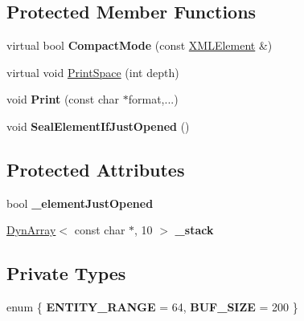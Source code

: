 \subsection*{Protected Member Functions}
\begin{DoxyCompactItemize}
\item 
virtual bool {\bfseries Compact\+Mode} (const \hyperlink{classtinyxml2_1_1_x_m_l_element}{X\+M\+L\+Element} \&)\hypertarget{classtinyxml2_1_1_x_m_l_printer_a38e1ed5a779bdf63eda9e808f7a6de66}{}\label{classtinyxml2_1_1_x_m_l_printer_a38e1ed5a779bdf63eda9e808f7a6de66}

\item 
virtual void \hyperlink{classtinyxml2_1_1_x_m_l_printer_a01148e2ebe6776e38c5a3e41bc5feb74}{Print\+Space} (int depth)
\item 
void {\bfseries Print} (const char $\ast$format,...)\hypertarget{classtinyxml2_1_1_x_m_l_printer_ab30210a7f32e45634e7a45137bf6fdf6}{}\label{classtinyxml2_1_1_x_m_l_printer_ab30210a7f32e45634e7a45137bf6fdf6}

\item 
void {\bfseries Seal\+Element\+If\+Just\+Opened} ()\hypertarget{classtinyxml2_1_1_x_m_l_printer_ac6e2c72c5d796f5b4de6ce81ca95e3fa}{}\label{classtinyxml2_1_1_x_m_l_printer_ac6e2c72c5d796f5b4de6ce81ca95e3fa}

\end{DoxyCompactItemize}
\subsection*{Protected Attributes}
\begin{DoxyCompactItemize}
\item 
bool {\bfseries \+\_\+element\+Just\+Opened}\hypertarget{classtinyxml2_1_1_x_m_l_printer_ac07169d58b465214a2b1fa306e617c26}{}\label{classtinyxml2_1_1_x_m_l_printer_ac07169d58b465214a2b1fa306e617c26}

\item 
\hyperlink{classtinyxml2_1_1_dyn_array}{Dyn\+Array}$<$ const char $\ast$, 10 $>$ {\bfseries \+\_\+stack}\hypertarget{classtinyxml2_1_1_x_m_l_printer_a99d59e67e084714541bee3ae43884bef}{}\label{classtinyxml2_1_1_x_m_l_printer_a99d59e67e084714541bee3ae43884bef}

\end{DoxyCompactItemize}
\subsection*{Private Types}
\begin{DoxyCompactItemize}
\item 
enum \{ {\bfseries E\+N\+T\+I\+T\+Y\+\_\+\+R\+A\+N\+GE} = 64, 
{\bfseries B\+U\+F\+\_\+\+S\+I\+ZE} = 200
 \}\hypertarget{classtinyxml2_1_1_x_m_l_printer_a6a3ddf4e65f2965d22ffd75de0a83e86}{}\label{classtinyxml2_1_1_x_m_l_printer_a6a3ddf4e65f2965d22ffd75de0a83e86}

\end{DoxyCompactItemize}
